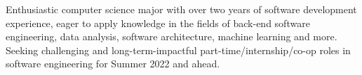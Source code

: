 \documentclass[letter,10pt]{article}
\begin{document}

Enthusiastic computer science major with over two years of software development experience, eager to apply knowledge in the fields of back-end software engineering, data analysis, software architecture, machine learning and more.  
Seeking challenging and long-term-impactful part-time/internship/co-op roles in software engineering for Summer 2022 and ahead. 
\end{document}
